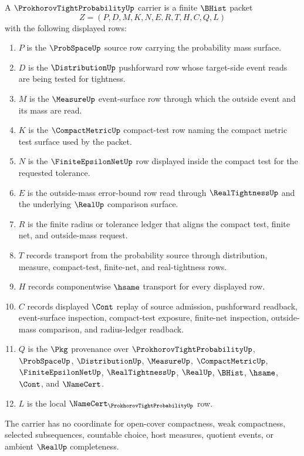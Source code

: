 \begin{definition}
\label{def:prokhorov-tight-probability-carrier}
A $\ProkhorovTightProbabilityUp$ carrier is a finite $\BHist$ packet
$$
Z=(P,D,M,K,N,E,R,T,H,C,Q,L)
$$
with the following displayed rows:
\begin{enumerate}
\item $P$ is the $\ProbSpaceUp$ source row carrying the probability mass surface.
\item $D$ is the $\DistributionUp$ pushforward row whose target-side event reads are being tested for tightness.
\item $M$ is the $\MeasureUp$ event-surface row through which the outside event and its mass are read.
\item $K$ is the $\CompactMetricUp$ compact-test row naming the compact metric test surface used by the packet.
\item $N$ is the $\FiniteEpsilonNetUp$ row displayed inside the compact test for the requested tolerance.
\item $E$ is the outside-mass error-bound row read through $\RealTightnessUp$ and the underlying $\RealUp$ comparison surface.
\item $R$ is the finite radius or tolerance ledger that aligns the compact test, finite net, and outside-mass request.
\item $T$ records transport from the probability source through distribution, measure, compact-test, finite-net, and real-tightness rows.
\item $H$ records componentwise $\hsame$ transport for every displayed row.
\item $C$ records displayed $\Cont$ replay of source admission, pushforward readback, event-surface inspection, compact-test exposure, finite-net inspection, outside-mass comparison, and radius-ledger readback.
\item $Q$ is the $\Pkg$ provenance over $\ProkhorovTightProbabilityUp$, $\ProbSpaceUp$, $\DistributionUp$, $\MeasureUp$, $\CompactMetricUp$, $\FiniteEpsilonNetUp$, $\RealTightnessUp$, $\RealUp$, $\BHist$, $\hsame$, $\Cont$, and $\NameCert$.
\item $L$ is the local $\NameCert_{\ProkhorovTightProbabilityUp}$ row.
\end{enumerate}
The carrier has no coordinate for open-cover compactness, weak compactness, selected subsequences, countable choice, host measures, quotient events, or ambient $\RealUp$ completeness.
\end{definition}

